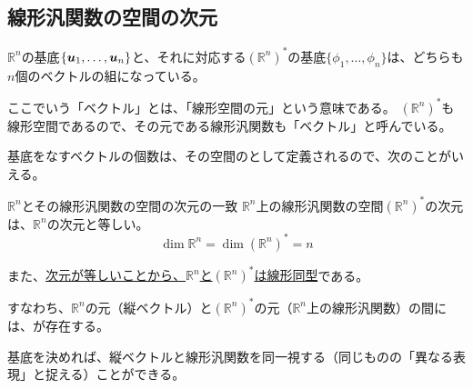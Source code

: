 \documentclass[../../../topic_linear-algebra]{subfiles}
\begin{document}
\subsection{線形汎関数の空間の次元}

$\mathbb{R}^n$の基底$\{ \vb*{u}_1, \ldots, \vb*{u}_n \}$と、それに対応する$(\mathbb{R}^n)^*$の基底$\{ \phi_1, \ldots, \phi_n \}$は、どちらも$n$個のベクトルの組になっている。

\begin{supplnote}
  ここでいう「ベクトル」とは、「線形空間の元」という意味である。
  $(\mathbb{R}^n)^*$も線形空間であるので、その元である線形汎関数も「ベクトル」と呼んでいる。
\end{supplnote}

基底をなすベクトルの個数は、その空間のとして定義されるので、次のことがいえる。

\begin{theorem}{$\mathbb{R}^n$とその線形汎関数の空間の次元の一致}
  $\mathbb{R}^n$上の線形汎関数の空間$(\mathbb{R}^n)^*$の次元は、$\mathbb{R}^n$の次元と等しい。
  \begin{equation*}
    \dim \mathbb{R}^n = \dim (\mathbb{R}^n)^* = n
  \end{equation*}
\end{theorem}

また、\hyperref[thm:abstract-linear-pigeonhole]{次元が等しいことから、$\mathbb{R}^n$と$(\mathbb{R}^n)^*$は線形同型}である。

すなわち、$\mathbb{R}^n$の元（縦ベクトル）と$(\mathbb{R}^n)^*$の元（$\mathbb{R}^n$上の線形汎関数）の間には、が存在する。

\br

基底を決めれば、縦ベクトルと線形汎関数を同一視する（同じものの「異なる表現」と捉える）ことができる。
\end{document}

